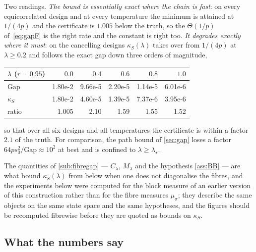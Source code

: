 \documentclass[aos]{imsart}
\theoremstyle{plain}
\theoremstyle{definition}
\begin{document}
    Two readings. \emph{The bound is essentially exact where the chain is
    fast}: on every equicorrelated design and at every temperature the
    minimum is attained at $1/(4p)$ and the certificate is $1.005$ below the
    truth, so the $\Theta(1/p)$ of~\eqref{eq:gapF} is the right rate and the
    constant is right too. \emph{It degrades exactly where it must}: on the
    cancelling designs $\kappa_S(\lambda)$ takes over from $1/(4p)$ at
    $\lambda\geq0.2$ and follows the exact gap down three orders of
    magnitude,
    \begin{center}\small
        \begin{tabular}{lrrrrr}
            \hline
            $\lambda$ ($r=0.95$) & $0.0$ & $0.4$ & $0.6$ & $0.8$ & $1.0$\\
            \hline
            $\mathrm{Gap}$ & 1.80e-2 & 9.66e-5 & 2.20e-5 & 1.14e-5 & 6.01e-6\\
            $\kappa_S$     & 1.80e-2 & 4.60e-5 & 1.39e-5 & 7.37e-6 & 3.95e-6\\
            ratio          & 1.005 & 2.10 & 1.59 & 1.55 & 1.52\\
            \hline
        \end{tabular}
    \end{center}
    so that over all six designs and all temperatures the certificate is
    within a factor $2.1$ of the truth. For comparison, the path bound of
    \cref{sec:gap} loses a factor $64ps_0^{2}/\mathrm{Gap}\approx10^{2}$ at
    best and is confined to $\lambda\geq\lambda_\star$.

    The quantities of \cref{sub:fibregap} --- $C_\lambda$, $M_\lambda$ and
    the hypothesis \cref{ass:BB} --- are what bound $\kappa_S(\lambda)$ from
    below when one does not diagonalise the fibres, and the experiments
    below were computed for the block measure of an earlier version of this
    construction rather than for the fibre measures $\mu_\sigma$; they
    describe the same objects on the same state space and the same
    hypotheses, and the figures should be recomputed fibrewise before they
    are quoted as bounds on $\kappa_S$.

    \subsection{What the numbers say}
    \label{sub:numbers}
\end{document}
